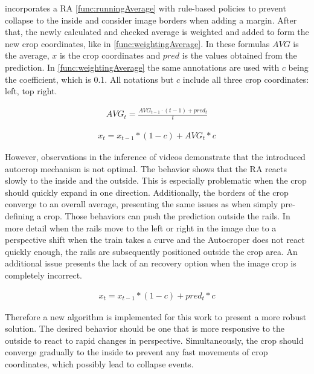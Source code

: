 \cite{tepNet2024} incorporates a \ac{RA} \autoref{func:runningAverage} with rule-based policies to prevent collapse to the inside and consider image borders when adding a margin. After that, the newly calculated and checked average is weighted and added to form the new crop coordinates, like in \autoref{func:weightingAverage}. In these formulas $AVG$ is the average, $x$ is the crop coordinates and $pred$ is the values obtained from the prediction. In \autoref{func:weightingAverage} the same annotations are used with $c$ being the coefficient, which is 0.1. All notations but $c$ include all three crop coordinates: left, top right.

\begin{align}
    AVG_t = \frac{AVG_{t-1} \cdot (t-1) + pred_t}{t}
    \label{func:runningAverage}
\end{align}

\begin{align}
    x_{t} = x_{t-1} * (1 - c) + AVG_{t} * c
    \label{func:weightingAverage}
\end{align}

However, observations in the inference of videos demonstrate that the introduced autocrop mechanism is not optimal. The behavior shows that the \ac{RA} reacts slowly to the inside and the outside. This is especially problematic when the crop should quickly expand in one direction. Additionally, the borders of the crop converge to an overall average, presenting the same issues as when simply pre-defining a crop. Those behaviors can push the prediction outside the rails. In more detail when the rails move to the left or right in the image due to a perspective shift when the train takes a curve and the Autocroper does not react quickly enough, the rails are subsequently positioned outside the crop area. An additional issue presents the lack of an recovery option when the image crop is completely incorrect.

\begin{align}
    x_t =  x_{t-1} * (1 - c) + pred_t * c
    \label{func:EMA}
\end{align}

Therefore a new algorithm is implemented for this work to present a more robust solution.
The desired behavior should be one that is more responsive to the outside to react to rapid changes in perspective.
Simultaneously, the crop should converge gradually to the inside to prevent any fast movements of crop coordinates, which possibly lead to collapse events.

